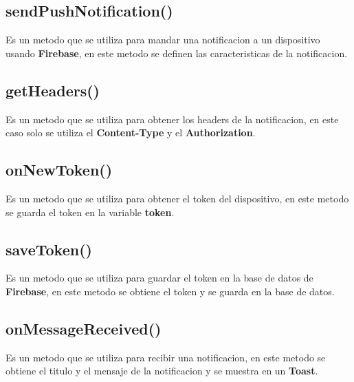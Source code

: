 \documentclass{article}
\begin{document}
\subsection{sendPushNotification()}
Es un metodo que se utiliza para mandar una notificacion a un dispositivo usando
\textbf{Firebase}, en este metodo se definen las caracteristicas de la notificacion.

\subsection{getHeaders()}
Es un metodo que se utiliza para obtener los headers de la notificacion, en este
caso solo se utiliza el \textbf{Content-Type} y el \textbf{Authorization}.

\subsection{onNewToken()}
Es un metodo que se utiliza para obtener el token del dispositivo, en este metodo
se guarda el token en la variable \textbf{token}.

\subsection{saveToken()}
Es un metodo que se utiliza para guardar el token en la base de datos de
\textbf{Firebase}, en este metodo se obtiene el token y se guarda en la base
de datos.

\subsection{onMessageReceived()}
Es un metodo que se utiliza para recibir una notificacion, en este metodo se
obtiene el titulo y el mensaje de la notificacion y se muestra en un \textbf{Toast}.
\end{document}
